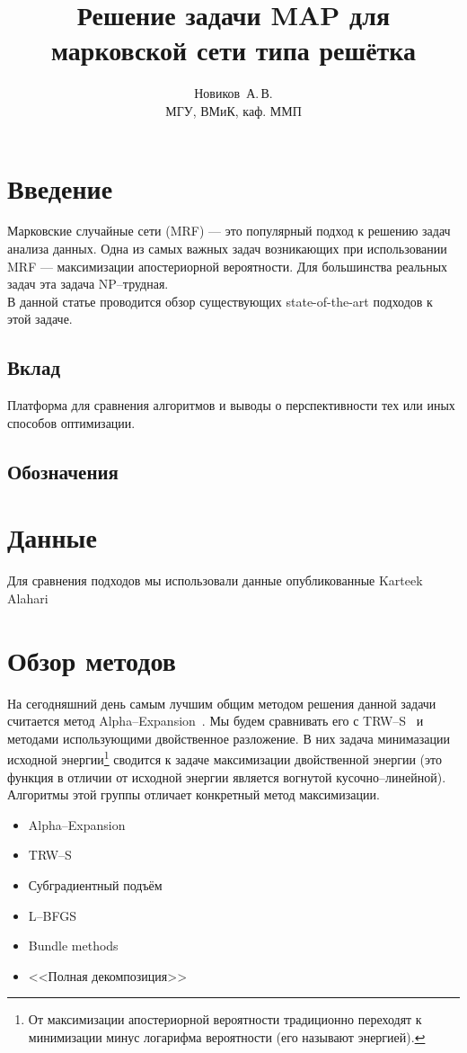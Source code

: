 \documentclass{article}
\title
    {Решение задачи MAP для марковской сети типа решётка}
\author
    {Новиков~А.\,В.\\
    МГУ, ВМиК, каф. ММП}
\begin{document}
\maketitle

\pagebreak

\section{Введение}
Марковские случайные сети (MRF) --- это популярный подход к решению задач анализа данных.
Одна из самых важных задач возникающих при использовании MRF ---
максимизации апостериорной вероятности.
Для большинства реальных задач эта задача NP--трудная.\\
В данной статье проводится обзор существующих
state-of-the-art подходов к этой задаче.

\subsection{Вклад}
Платформа для сравнения алгоритмов и выводы о перспективности тех или иных способов оптимизации.

\subsection{Обозначения}


\section{Данные}
Для сравнения подходов мы использовали данные
опубликованные Karteek Alahari~\cite{Alahari}
\pagebreak

\section{Обзор методов}
На сегодняшний день самым лучшим общим
методом решения данной задачи считается
метод Alpha--Expansion~\cite{AlphaExp}.
Мы будем сравнивать его с TRW--S~\cite{TRWS} и методами использующими
двойственное разложение. В них задача минимазации
исходной энергии\footnote{От максимизации апостериорной вероятности традиционно переходят
к минимизации минус логарифма вероятности (его называют энергией).}
сводится к задаче максимизации
двойственной энергии (это функция в отличии от исходной энергии
является вогнутой кусочно--линейной).
Алгоритмы этой группы отличает конкретный метод максимизации.


\begin{itemize}
\item Alpha--Expansion~\cite{AlphaExp}
\item TRW--S~\cite{TRWS}
\item Субградиентный подъём~\cite{Subgradient}
\item L--BFGS~\cite{BFGS}
\item Bundle methods~\cite{Bundle}
\item <<Полная декомпозиция>>
\end{itemize}
\pagebreak
\end{document}
